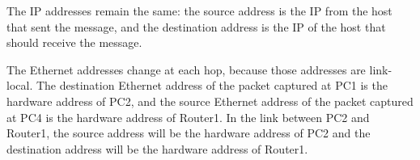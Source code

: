 The IP addresses remain the same: the source address is the IP from the host that sent the message, and the destination address is the IP of the host that should receive the message.

The Ethernet addresses change at each hop, because those addresses are link-local. The destination Ethernet address of the packet captured at PC1 is the hardware address of PC2, and the source Ethernet address of the packet captured at PC4 is the hardware address of Router1. In the link between PC2 and Router1, the source address will be the hardware address of PC2 and the destination address will be the hardware address of Router1.